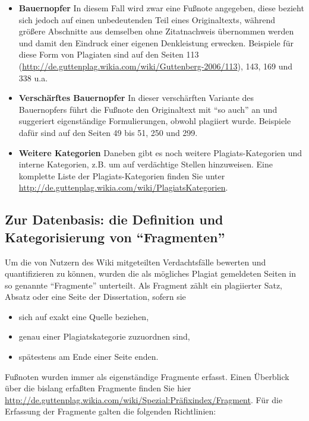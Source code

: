 \documentclass[ngerman,final,fontsize=12pt,paper=a4,twoside,BCOR=8mm,draft=false]{scrartcl}
\begin{document}
\begin{itemize}
\item \textbf{Bauernopfer} 
In diesem Fall wird zwar eine Fußnote angegeben, diese bezieht sich jedoch auf einen unbedeutenden Teil eines Originaltexts, während größere Abschnitte aus demselben ohne Zitatnachweis übernommen werden und damit den Eindruck einer eigenen Denkleistung erwecken. Beispiele für diese Form von Plagiaten sind auf den Seiten 113 (\url{http://de.guttenplag.wikia.com/wiki/Guttenberg-2006/113}), 143, 169 und 338 u.a.

\item \textbf{Verschärftes Bauernopfer} 
In dieser verschärften Variante des Bauernopfers führt die Fußnote den Originaltext mit "`so auch"' an und suggeriert eigenständige Formulierungen, obwohl plagiiert wurde. Beispiele dafür sind auf den Seiten 49 bis 51, 250 und 299.
\item \textbf{Weitere Kategorien} 
Daneben gibt es noch weitere Plagiats-Kategorien und interne Kategorien, z.B. um auf verdächtige Stellen hinzuweisen. Eine komplette Liste der Plagiats-Kategorien finden Sie unter \url{http://de.guttenplag.wikia.com/wiki/PlagiatsKategorien}.
\end{itemize}

\newpage
\subsection{Zur Datenbasis: die Definition und Kategorisierung von "`Fragmenten"'}
Um die von Nutzern des Wiki mitgeteilten Verdachtsfälle bewerten und quantifizieren zu können, wurden die als mögliches Plagiat gemeldeten Seiten in so genannte "`Fragmente"' unterteilt. Als Fragment zählt ein plagiierter Satz, Absatz oder eine Seite der Dissertation, sofern sie

\begin{itemize}
\item sich auf exakt eine Quelle beziehen,
\item genau einer Plagiatskategorie zuzuordnen sind,
\item spätestens am Ende einer Seite enden.
\end{itemize}

Fußnoten wurden immer als eigenständige Fragmente erfasst. Einen
Überblick über die bislang erfaßten Fragmente finden Sie hier \url{http://de.guttenplag.wikia.com/wiki/Spezial:Präfixindex/Fragment}.  Für
die Erfassung der Fragmente galten die folgenden Richtlinien:
\end{document}
